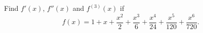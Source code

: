 Find $f'(x)$, $f''(x)$ and $f^{(3)}(x)$ if
\[
f(x)=1+x+\frac{x^2}{2}+\frac{x^3}{6}+\frac{x^4}{24}
+\frac{x^5}{120}+\frac{x^6}{720}.
\]\answercheck
